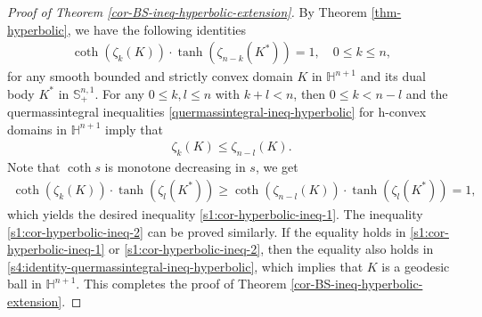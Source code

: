 \documentclass[11pt,reqno]{amsart}
\theoremstyle{definition}
\theoremstyle{remark}
\numberwithin{equation}{section}
\renewcommand{\(}{\left(}
\renewcommand{\)}{\right)}
\renewcommand{\~}{\tilde}
\renewcommand{\-}{\overline}
\begin{document}
\begin{proof}[Proof of Theorem \ref{cor-BS-ineq-hyperbolic-extension}]
	By Theorem \ref{thm-hyperbolic}, we have the following identities
	\begin{align}\label{s4:identity-in-hyperbolic}
	\coth(\zeta_k(K)) \cdot \tanh(\zeta_{n-k}(K^\ast))=1, \quad 0\leq k\leq n,
	\end{align}
	for any smooth bounded and strictly convex domain $K$ in $\mathbb H^{n+1}$ and its dual body $K^\ast$ in $\mathbb S^{n,1}_{+}$. For any $0\leq k,l\leq n$ with $k+l<n$, then $0\leq k<n-l$ and the quermassintegral inequalities \eqref{quermassintegral-ineq-hyperbolic} for h-convex domains in $\mathbb H^{n+1}$ imply that
	\begin{align}\label{s4:identity-quermassintegral-ineq-hyperbolic}
	\zeta_k(K) \leq \zeta_{n-l}(K).
	\end{align}
	Note that $\coth s$ is monotone decreasing in $s$, we get
	\begin{align*}
	\coth(\zeta_k(K)) \cdot \tanh(\zeta_{l}(K^\ast)) \geq \coth(\zeta_{n-l}(K)) \cdot \tanh(\zeta_{l}(K^\ast))=1,
	\end{align*}
	which yields the desired inequality \eqref{s1:cor-hyperbolic-ineq-1}. The inequality \eqref{s1:cor-hyperbolic-ineq-2} can be proved similarly. If the equality holds in \eqref{s1:cor-hyperbolic-ineq-1} or \eqref{s1:cor-hyperbolic-ineq-2}, then the equality also holds in \eqref{s4:identity-quermassintegral-ineq-hyperbolic}, which implies that $K$ is a geodesic ball in $\mathbb H^{n+1}$. This completes the proof of Theorem \ref{cor-BS-ineq-hyperbolic-extension}.	
\end{proof}
\end{document}
